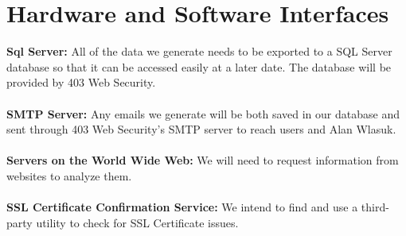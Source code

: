 \section{Hardware and Software Interfaces}
\textbf{Sql Server: } All of the data we generate needs to be exported to a SQL Server database so that it can be accessed easily at a later date. The database will be provided by 403 Web Security.
\\
\\
\textbf{SMTP Server: } Any emails we generate will be both saved in our database and sent through 403 Web Security's SMTP server to reach users and Alan Wlasuk.
\\
\\
\textbf{Servers on the World Wide Web: } We will need to request information from websites to analyze them. 
\\
\\
\textbf{SSL Certificate Confirmation Service: } We intend to find and use a third-party utility to check for SSL Certificate issues.